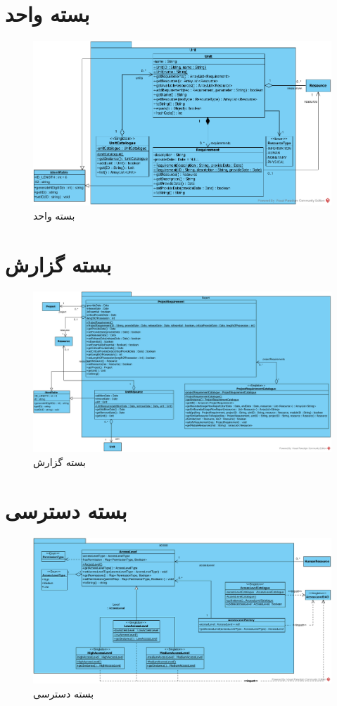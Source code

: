 \section{بسته واحد}
\begin{figure}[H]
	\centering
	\includegraphics[scale=0.6]{img/class-design/UnitPackage}
	\caption{بسته واحد}
\end{figure}

\section{بسته گزارش}
\begin{figure}[H]
	\centering
	\includegraphics[scale=0.45]{img/class-design/ReportPackage}
	\caption{بسته گزارش}
\end{figure}

\section{بسته دسترسی}
\begin{figure}[H]
	\centering
	\includegraphics[scale=0.6]{img/class-design/AccessPackage}
	\caption{بسته دسترسی}
\end{figure}

